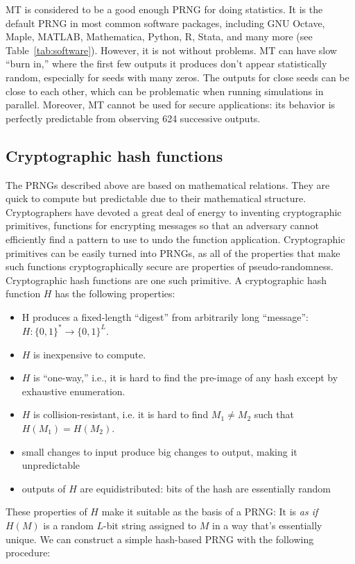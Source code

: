 \documentclass[graybox]{svmult}
\newcommand{\todo}[1]{{\color{red}{TO DO: \sc #1}}}
\begin{document}
MT is considered to be a good enough PRNG for doing statistics.
It is the default PRNG in most common software packages, including GNU Octave, Maple, MATLAB, Mathematica, Python, R, Stata, and many more (see Table~\ref{tab:software}).
However, it is not without problems.
MT can have slow ``burn in,'' where the first few outputs it produces don't appear statistically random, especially for seeds with many zeros. \todo{CITE}
The outputs for close seeds can be close to each other, which can be problematic when running simulations in parallel. 
Moreover, MT cannot be used for secure applications: its behavior is perfectly predictable from observing 624 successive outputs.


\subsection{Cryptographic hash functions}
The PRNGs described above are based on mathematical relations.
They are quick to compute but predictable due to their mathematical structure.
Cryptographers have devoted a great deal of energy to inventing cryptographic primitives,
functions for encrypting messages so that an adversary cannot efficiently find a pattern to use to undo the function application.
Cryptographic primitives can be easily turned into PRNGs, as all of the properties that make such functions cryptographically secure
are properties of pseudo-randomness.
Cryptographic hash functions are one such primitive.
A cryptographic hash function $H$ has the following properties:

\begin{itemize}
\item H produces a fixed-length ``digest'' from arbitrarily long ``message'': $H:\{0, 1\}^* \rightarrow \{0, 1\}^L$.
\item $H$ is inexpensive to compute.
\item $H$ is ``one-way,'' i.e., it is hard to find the pre-image of any hash except by exhaustive enumeration.
\item $H$ is collision-resistant, i.e. it is hard to find $M_1 \ne M_2$ such that $H(M_1) = H(M_2)$.
\item small changes to input produce big changes to output, making it unpredictable
\item outputs of $H$ are equidistributed: bits of the hash are essentially random 
\end{itemize}

These properties of $H$ make it suitable as the basis of a PRNG:
It is \emph{as if} $H(M)$ is a random $L$-bit string assigned to $M$ in a way that's essentially unique.
We can construct a simple hash-based PRNG with the following procedure:
\end{document}
